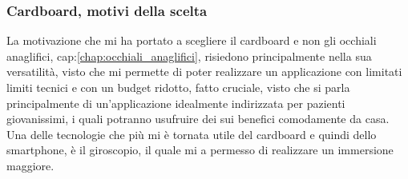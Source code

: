\documentclass[10pt,a4paper]{article}
\begin{document}
  \subsubsection{Cardboard, motivi della scelta}\label{chap:cardboard_motivi}
    La motivazione che mi ha portato a scegliere il cardboard e non gli occhiali anaglifici, cap:\ref{chap:occhiali_anaglifici}, risiedono principalmente nella sua versatilità, visto che mi permette di poter realizzare un applicazione con limitati limiti tecnici e con un budget ridotto, fatto cruciale, visto che si parla principalmente di un'applicazione idealmente indirizzata per pazienti giovanissimi, i quali potranno usufruire dei sui benefici comodamente da casa.
    Una delle tecnologie che più mi è tornata utile del cardboard e quindi dello smartphone, è il giroscopio, il quale mi a permesso di realizzare un immersione maggiore.
\end{document}
